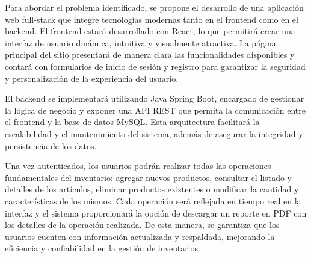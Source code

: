 Para abordar el problema identificado, se propone el desarrollo de una aplicación web full-stack que integre tecnologías modernas tanto en el frontend como en el backend. El frontend estará desarrollado con React, lo que permitirá crear una interfaz de usuario dinámica, intuitiva y visualmente atractiva. La página principal del sitio presentará de manera clara las funcionalidades disponibles y contará con formularios de inicio de sesión y registro para garantizar la seguridad y personalización de la experiencia del usuario.

El backend se implementará utilizando Java Spring Boot, encargado de gestionar la lógica de negocio y exponer una API REST que permita la comunicación entre el frontend y la base de datos MySQL. Esta arquitectura facilitará la escalabilidad y el mantenimiento del sistema, además de asegurar la integridad y persistencia de los datos.

Una vez autenticados, los usuarios podrán realizar todas las operaciones fundamentales del inventario: agregar nuevos productos, consultar el listado y detalles de los artículos, eliminar productos existentes o modificar la cantidad y características de los mismos. Cada operación será reflejada en tiempo real en la interfaz y el sistema proporcionará la opción de descargar un reporte en PDF con los detalles de la operación realizada. De esta manera, se garantiza que los usuarios cuenten con información actualizada y respaldada, mejorando la eficiencia y confiabilidad en la gestión de inventarios.
